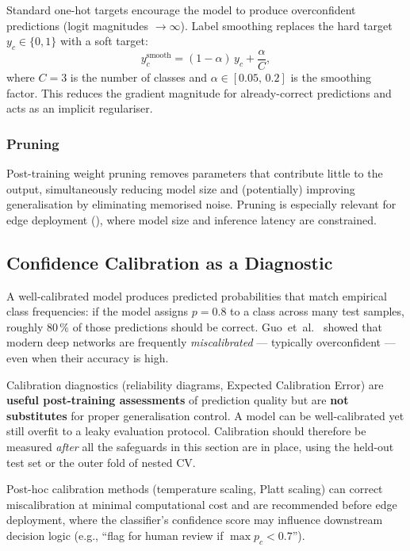 Standard one-hot targets encourage the model to produce overconfident
predictions (logit magnitudes $\to \infty$).  Label smoothing replaces
the hard target $y_c \in \{0,1\}$ with a soft target:
\begin{equation}
  y_c^{\text{smooth}} = (1 - \alpha)\,y_c + \frac{\alpha}{C},
  \label{eq:label_smooth}
\end{equation}
where $C=3$ is the number of classes and $\alpha \in [0.05,\,0.2]$ is
the smoothing factor.  This reduces the gradient magnitude for
already-correct predictions and acts as an implicit regulariser.

\subsubsection{Pruning}
\label{sec:overfit:reg:pruning}

Post-training weight pruning removes parameters that contribute little
to the output, simultaneously reducing model size and (potentially)
improving generalisation by eliminating memorised noise.  Pruning is
especially relevant for edge deployment (), where
model size and inference latency are constrained.

\subsection{Confidence Calibration as a Diagnostic}
\label{sec:overfit:calibration}

A well-calibrated model produces predicted probabilities that match
empirical class frequencies: if the model assigns $p=0.8$ to a class
across many test samples, roughly $80\,\%$ of those predictions should
be correct.  Guo~et~al.~\cite{guo2017calibration} showed that modern
deep networks are frequently \emph{miscalibrated} — typically
overconfident — even when their accuracy is high.

Calibration diagnostics (reliability diagrams, Expected Calibration
Error) are \textbf{useful post-training assessments} of prediction
quality but are \textbf{not substitutes} for proper generalisation
control.  A model can be well-calibrated yet still overfit to a leaky
evaluation protocol.  Calibration should therefore be measured
\emph{after} all the safeguards in this section are in place, using the
held-out test set or the outer fold of nested CV.

Post-hoc calibration methods (temperature scaling, Platt scaling) can
correct miscalibration at minimal computational cost and are recommended
before edge deployment, where the classifier's confidence score may
influence downstream decision logic (e.g., ``flag for human review if
$\max p_c < 0.7$'').

